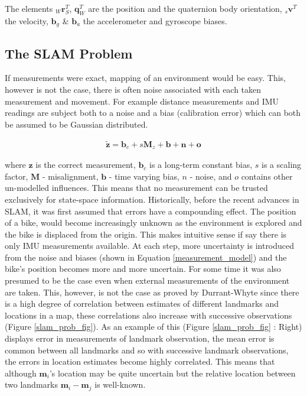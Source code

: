 \documentclass[11pt,twoside]{report}
\begin{document}
The elements $_{W}\textbf{r}_{S}^{T}$, $\textbf{{q}}_{W}^{T}$ are the position and the quaternion body orientation, $_{s}\textbf{{v}}^{T}$ the velocity, $\textbf{{b}}_{g}$ \& $\textbf{{b}}_{a}$ the accelerometer and gyroscope biases.


\subsection{The SLAM Problem}

If measurements were exact, mapping of an environment would be easy. This, however is not the case, there is often noise associated with each taken measurement and movement. For example distance measurements and IMU readings are subject both to a noise and a bias (calibration error) which can both be assumed to be Gaussian distributed.

\begin{equation}
\begin{aligned}
\mathbf{\tilde{z}} = \textbf{b}_{c} + s\textbf{M}_{z} + \textbf{b} + \textbf{n} + \textbf{o}
\end{aligned}
\label{measurement_model}
\end{equation}

where $\textbf{z}$ is the correct measurement, $\textbf{b}_{c}$ is a long-term constant bias, $s$ is a scaling factor, $\textbf{M}$ - misalignment, $\textbf{b}$ - time varying bias, $n$ - noise, and $o$ contains other un-modelled influences. This means that no measurement can be trusted exclusively for state-space information. \newline\newline
Historically, before the recent advances in SLAM, it was first assumed that errors have a compounding effect. The position of a bike, would become increasingly unknown as the environment is explored and the bike is displaced from the origin. This makes intuitive sense if say there is only IMU measurements available. At each step, more uncertainty is introduced from the noise and biases (shown in Equation \ref{measurement_model}) and the bike's position becomes more and more uncertain. 
\newline \newline
For some time it was also presumed to be the case even when external measurements of the environment are taken. This, however, is not the case as proved by Durrant-Whyte \cite{F_Durr_1} since there is a high degree of correlation between estimates of different landmarks and locations in a map, these correlations also increase with successive observations (Figure \ref{slam_prob_fig}). As an example of this (Figure \ref{slam_prob_fig} : Right) displays error in measurements of landmark observation, the mean error is common between all landmarks and so with successive landmark observations, the errors in location estimates become highly correlated. This means that although $\textbf{m}_{i}$'s location may be quite uncertain but the relative location between two landmarks $\textbf{m}_{i}-\textbf{m}_{j}$ is well-known.\newline
\end{document}
